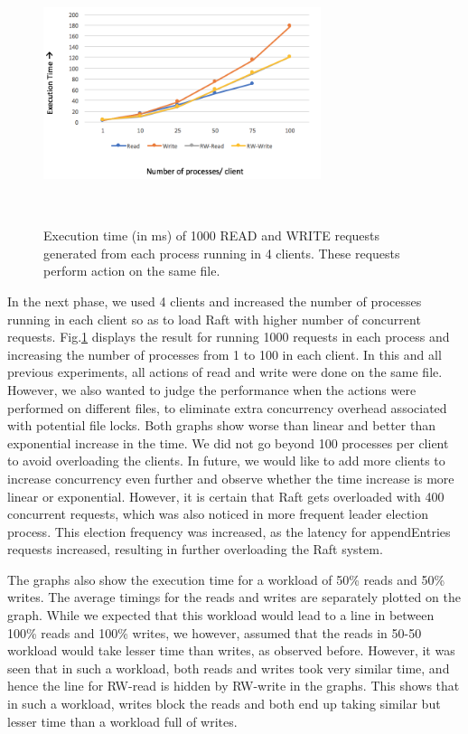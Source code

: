 \begin{figure}[h]
\centering
\includegraphics[height=2in, width=3.2in]{images/F-VHC-SF.png}
\caption{Execution time (in ms) of 1000 READ and WRITE requests generated from each process running in 4 clients. These requests perform action on the same file.}~\label{fig:figure5}
\end{figure}

In the next phase, we used 4 clients and increased the number of processes running in each client so as to load Raft with higher number of concurrent requests. Fig.\ref{fig:figure5} displays the result for running 1000 requests in each process and increasing the number of processes from 1 to 100 in each client. In this and all previous experiments, all actions of read and write were done on the same file. However, we also wanted to judge the performance when the actions were performed on different files, to eliminate extra concurrency overhead associated with potential file locks. Both graphs show worse than linear and better than exponential increase in the time. We did not go beyond 100 processes per client to avoid overloading the clients. In future, we would like to add more clients to increase concurrency even further and observe whether the time increase is more linear or exponential. However, it is certain that Raft gets overloaded with 400 concurrent requests, which was also noticed in more frequent leader election process. This election frequency was increased, as the latency for appendEntries requests increased, resulting in further overloading the Raft system. 

The graphs also show the execution time for a workload of 50\% reads and 50\% writes. The average timings for the reads and writes are separately plotted on the graph. While we expected that this workload would lead to a line in between 100\% reads and 100\% writes, we however, assumed that the reads in 50-50 workload would take lesser time than writes, as observed before. However, it was seen that in such a workload, both reads and writes took very similar time, and hence the line for RW-read is hidden by RW-write in the graphs. This shows that in such a workload, writes block the reads and both end up taking similar but lesser time than a workload full of writes. 

